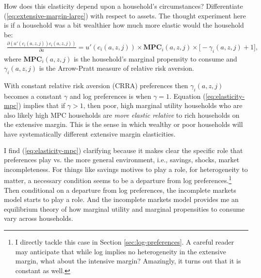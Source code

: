 \documentclass[12pt,pdftex]{article}
\begin{document}
\begin{onehalfspacing}
How does this elasticity depend upon a household's circumstances? Differentiate (\ref{eq:extensive-margin-large}) with respect to assets. The thought experiment here is if a household was a bit wealthier how much more elastic would the household be:
\begin{align}
\frac{\partial (u'(c_{i}(a,z,j))c_{i}(a,z,j))}{\partial a} = u'(c_{i}(a,z,j))\times \mathbf{MPC}_{i}(a,z,j) \times \bigg[-\gamma_{i}(a,z,j) + 1\bigg], \label{eq:elasticity-mpc}
\end{align}
where $\mathbf{MPC}_{i}(a,z,j)$ is the household's marginal propensity to consume and $\gamma_{i}(a,z,j)$ is the Arrow-Pratt measure of relative risk aversion.

With constant relative risk aversion (CRRA) preferences then $\gamma_{i}(a,z,j)$ becomes a constant $\gamma$ and log preferences is when $\gamma = 1$. Equation (\ref{eq:elasticity-mpc}) implies that if $\gamma > 1$, then poor, high marginal utility households who are also likely high MPC households are \emph{more elastic relative} to rich households on the extensive margin. This is the sense in which wealthy or poor households will have systematically different extensive margin elasticities.

I find  (\ref{eq:elasticity-mpc}) clarifying because it makes clear the specific role that preferences play vs. the more general environment, i.e., savings, shocks, market incompleteness. For things like savings motives to play a role, for heterogeneity to matter, a necessary condition seems to be a departure from log preferences.\footnote{I directly tackle this case in Section \ref{sec:log-preferences}. A careful reader may anticipate that while log implies no heterogeneity in the extensive margin, what about the intensive margin? Amazingly, it turns out that it is constant as well.} Then conditional on a departure from log preferences, the incomplete markets model starts to play a role. And the incomplete markets model provides me an equilibrium theory of how marginal utility and marginal propensities to consume vary across households.


\end{onehalfspacing}
\end{document}
